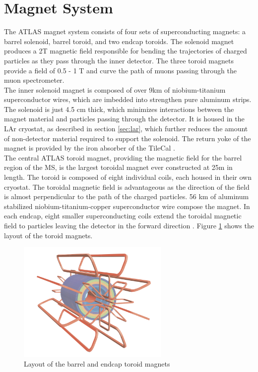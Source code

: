 \section{Magnet System}
\label{sec:magnets}
The ATLAS magnet system consists of four sets of superconducting magnets: a barrel solenoid, barrel toroid, and two endcap toroids. The solenoid magnet produces a 2T magnetic field responsible for bending the trajectories of charged particles as they pass through the inner detector. The three toroid magnets provide a field of 0.5 - 1 T and curve the path of muons passing through the muon spectrometer.\\

The inner solenoid magnet is composed of over 9km of niobium-titanium superconductor wires, which are imbedded into strengthen pure aluminum strips. The solenoid is just 4.5 cm thick, which minimizes interactions between the magnet material and particles passing through the detector. It is housed in the LAr cryostat, as described in section \ref{sec:lar}, which further reduces the amount of non-detector material required to support the solenoid. The return yoke of the magnet is provided by the iron absorber of the TileCal \cite{magnet_tdr}.\\ 

The central ATLAS toroid magnet, providing the magnetic field for the barrel region of the MS, is the largest toroidal magnet ever constructed at 25m in length. The toroid is composed of eight individual coils, each housed in their own cryostat. The toroidal magnetic field is advantageous as the direction of the field is almost perpendicular to the path of the charged particles. 56 km of aluminum stabilized niobium-titanium-copper superconductor wire compose the magnet. In each endcap, eight smaller superconducting coils extend the toroidal magnetic field to particles leaving the detector in the forward direction \cite{magnet_tdr}. Figure \ref{fig:magnets} shows the layout of the toroid magnets.

\begin{figure}
        \centering
	\includegraphics[width=0.65\textwidth]{figures/ch3/magnets.png}
	\caption{Layout of the barrel and endcap toroid magnets \cite{atlas_overview} }
	\label{fig:magnets}
\end{figure}

